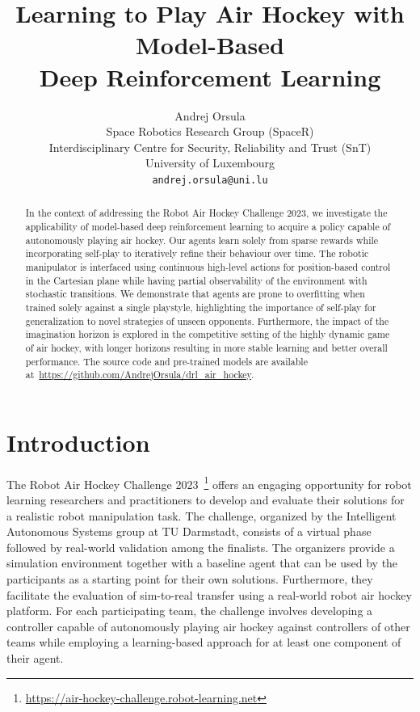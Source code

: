 \documentclass{article}
\title{Learning to Play Air Hockey with Model-Based \\ Deep Reinforcement Learning}
\author{
 Andrej Orsula \\
 Space Robotics Research Group (SpaceR) \\
 Interdisciplinary Centre for Security, Reliability and Trust (SnT) \\
 University of Luxembourg \\
  \texttt{andrej.orsula@uni.lu} \\
}
\begin{document}
\maketitle

\begin{abstract}
    In the context of addressing the Robot Air Hockey Challenge 2023, we investigate the applicability of model-based deep reinforcement learning to acquire a policy capable of autonomously playing air hockey. Our agents learn solely from sparse rewards while incorporating self-play to iteratively refine their behaviour over time. The robotic manipulator is interfaced using continuous high-level actions for position-based control in the Cartesian plane while having partial observability of the environment with stochastic transitions. We demonstrate that agents are prone to overfitting when trained solely against a single playstyle, highlighting the importance of self-play for generalization to novel strategies of unseen opponents. Furthermore, the impact of the imagination horizon is explored in the competitive setting of the highly dynamic game of air hockey, with longer horizons resulting in more stable learning and better overall performance. The source code and pre-trained models are available at~\href{https://github.com/AndrejOrsula/drl_air_hockey}{https://github.com/AndrejOrsula/drl\_air\_hockey}.
\end{abstract}

\section{Introduction}\label{sec:introduction}

The Robot Air Hockey Challenge 2023~\footnote{\url{https://air-hockey-challenge.robot-learning.net}} offers an engaging opportunity for robot learning researchers and practitioners to develop and evaluate their solutions for a realistic robot manipulation task. The challenge, organized by the Intelligent Autonomous Systems group at TU Darmstadt, consists of a virtual phase followed by real-world validation among the finalists. The organizers provide a simulation environment together with a baseline agent that can be used by the participants as a starting point for their own solutions. Furthermore, they facilitate the evaluation of sim-to-real transfer using a real-world robot air hockey platform. For each participating team, the challenge involves developing a controller capable of autonomously playing air hockey against controllers of other teams while employing a learning-based approach for at least one component of their agent.
\end{document}
